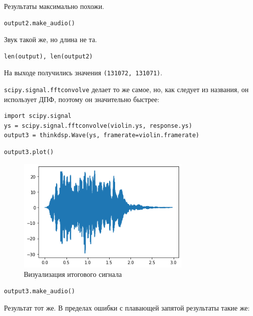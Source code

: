 \documentclass[a4paper,12pt]{report}
\begin{document}
Результаты максимально похожи.

\begin{lstlisting}[caption=Прослушивание итогового сигнала]
output2.make_audio()
\end{lstlisting}

Звук такой же, но длина не та.

\begin{lstlisting}[caption=Сравнение длин сигналов]
len(output), len(output2)
\end{lstlisting}

На выходе получились значения \texttt{(131072, 131071)}.

\texttt{scipy.signal.fftconvolve} делает то же самое, но, как следует из названия, он использует ДПФ, поэтому он значительно быстрее:

\begin{lstlisting}[caption=Изменение сигнала при помощи \texttt{scipy.signal.fftconvolve}]
import scipy.signal
ys = scipy.signal.fftconvolve(violin.ys, response.ys)
output3 = thinkdsp.Wave(ys, framerate=violin.framerate)
\end{lstlisting}

\begin{lstlisting}[caption=Визуализация итогового сигнала]
output3.plot()
\end{lstlisting}

\begin{figure}[H]
        \centering
        \includegraphics[width=0.75\textwidth]{lab10_fig1_8.png}
        \caption{Визуализация итогового сигнала}
        \label{fig:lab10_fig1_8}
\end{figure}

\begin{lstlisting}[caption=Прослушивание сигнала]
output3.make_audio()
\end{lstlisting}

Результат тот же. В пределах ошибки с плавающей запятой результаты такие же:
\end{document}
